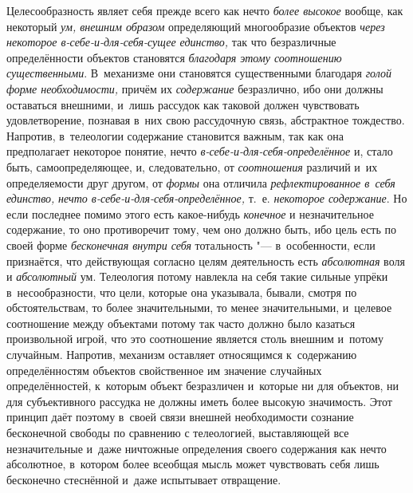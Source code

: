 Целесообразность являет себя прежде всего как нечто
{\em более высокое}
вообще, как некоторый
{\em ум, внешним образом}
определяющий многообразие объектов
{\em через некоторое
в-себе-и-для-себя-сущее единство,} так что безразличные
определённости объектов становятся
{\em благодаря этому соотношению
существенными}. В~механизме они становятся существенными
благодаря {\em голой форме
необходимости,} причём их
{\em содержание}
безразлично, ибо они должны оставаться внешними, и~лишь
рассудок как таковой должен чувствовать удовлетворение, познавая в~них свою
рассудочную связь, абстрактное тождество. Напротив, в~телеологии содержание
становится важным, так как она предполагает некоторое понятие, нечто
{\em в-себе-и-для-себя-определённое}
и, стало быть, самоопределяющее, и, следовательно, от
{\em соотношения}
различий и~их определяемости друг другом, от
{\em формы} она отличила
{\em рефлектированное в~себя единство,}
{\em нечто
в-себе-и-для-себя-определённое,} т.~е.
{\em некоторое содержание}.
Но если последнее помимо этого есть какое-нибудь
{\em конечное} и
незначительное содержание, то оно противоречит тому, чем оно должно быть,
ибо цель есть по своей форме
{\em бесконечная внутри себя}
тотальность "--- в~особенности, если признаётся,
что действующая согласно целям деятельность есть
{\em абсолютная} воля и
{\em абсолютный} ум.
Телеология потому навлекла на себя такие сильные упрёки в~несообразности,
что цели, которые она указывала, бывали, смотря по обстоятельствам, то
более значительными, то менее значительными, и~целевое соотношение между
объектами потому так часто должно было казаться произвольной игрой, что это
соотношение является столь внешним и~потому случайным. Напротив, механизм
оставляет относящимся к~содержанию определённостям объектов свойственное им
значение случайных определённостей, к~которым объект безразличен и~которые
ни для объектов, ни для субъективного рассудка не должны
иметь более высокую значимость. Этот принцип даёт поэтому в~своей связи
внешней необходимости сознание бесконечной свободы по сравнению с
телеологией, выставляющей все незначительные и~даже ничтожные определения
своего содержания как нечто абсолютное, в~котором более всеобщая мысль
может чувствовать себя лишь бесконечно стеснённой и~даже испытывает
отвращение.

